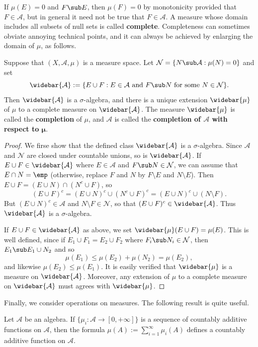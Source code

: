 If $\mu(E)=0$ and $F\sub E$, then $\mu(F)=0$ by monotonicity provided that $F\in\mathcal{A}$, but in general it need not be true that $F\in\mathcal{A}$. A measure whose domain includes all subsets of null sets is called \textbf{complete}. Completeness can sometimes obviate annoying technical points, and it can always be achieved by enlarging the domain of $\mu$, as follows.
\begin{theorem}\label{measure completion}
Suppose that $(X,\mathcal{A},\mu)$ is a measure space. Let $\mathcal{N}=\{N\sub\mathcal{A}:\mu(N)=0\}$ and set
\[\widebar{\mathcal{A}}:=\{E\cup F:\text{$E\in\mathcal{A}$ and $F\sub N$ for some $N\in\mathcal{N}$}\}.\]
Then $\widebar{\mathcal{A}}$ is a $\sigma$-algebra, and there is a unique extension $\widebar{\mu}$ of $\mu$ to a complete measure on $\widebar{\mathcal{A}}$. The measure $\widebar{\mu}$ is called the \textbf{completion} of $\mu$, and $\mathcal{A}$ is called the \textbf{completion of $\mathcal{A}$ with respect to $\bm{\mu}$}.
\end{theorem}
\begin{proof}
We firse show that the defined class $\widebar{\mathcal{A}}$ is a $\sigma$-algebra. Since $\mathcal{A}$ and $\mathcal{N}$ are closed under countable unions, so is $\widebar{\mathcal{A}}$. If $E\cup F\in\widebar{\mathcal{A}}$ where $E\in\mathcal{A}$ and $F\sub N\in\mathcal{N}$, we can assume that $E\cap N=\emp$ (otherwise, replace $F$ and $N$ by $F\setminus E$ and $N\setminus E$). Then $E\cup F=(E\cup N)\cap(N^c\cup F)$, so
\[(E\cup F)^c=(E\cup N)^c\cup(N^c\cup F)^c=(E\cup N)^c\cup(N\setminus F).\] But $(E\cup N)^c\in\mathcal{A}$ and $N\setminus F\in\mathcal{N}$, so that $(E\cup F)^c\in\widebar{\mathcal{A}}$. Thus $\widebar{\mathcal{A}}$ is a $\sigma$-algebra.\par
If $E\cup F\in\widebar{\mathcal{A}}$ as above, we set $\widebar{\mu}(E\cup F)=\mu(E)$. This is well defined, since if $E_1\cup F_1=E_2\cup F_2$ where $F_i\sub N_i\in\mathcal{N}$, then $E_1\sub E_1\cup N_2$ and so
\[\mu(E_1)\leq\mu(E_2)+\mu(N_2)=\mu(E_2),\]
and likewise $\mu(E_2)\leq\mu(E_1)$. It is easily verified that $\widebar{\mu}$ is a measure on $\widebar{\mathcal{A}}$. Moreover, any extension of $\mu$ to a complete measure on $\widebar{\mathcal{A}}$ must agrees with $\widebar{\mu}$.
\end{proof}
Finally, we consider operations on measures. The following result is quite useful.
\begin{proposition}
Let $\mathcal{A}$ be an algebra. If $\{\mu_i:\mathcal{A}\to[0,+\infty]\}$ is a sequence of countably additive functions on $\mathcal{A}$, then the formula $\mu(A):=\sum_{i=1}^{\infty}\mu_i(A)$ defines a countably additive function on $\mathcal{A}$.
\end{proposition}
